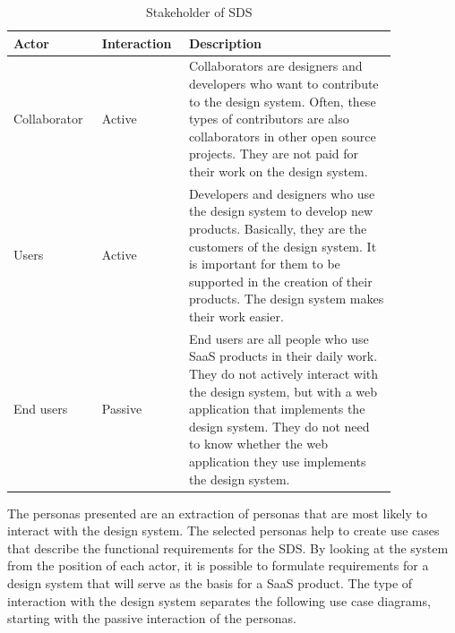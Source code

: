 \begin{table}[!ht]
    \begin{tabular}{|p{0.2\linewidth} | p{0.15\linewidth}| p{0.5\linewidth}|}
    \hline
     \textbf{Actor} &\textbf{Interaction} & \textbf{Description} \\ \hline
     Collaborator & Active & Collaborators are designers and developers who want to contribute to the design system. Often, these types of contributors are also collaborators in other open source projects. They are not paid for their work on the design system.  \\ \hline
     Users & Active & Developers and designers who use the design system to develop new products. Basically, they are the customers of the design system. It is important for them to be supported in the creation of their products. The design system makes their work easier.  \\ \hline
     End users & Passive & End users are all people who use SaaS products in their daily work. They do not actively interact with the design system, but with a web application that implements the design system. They do not need to know whether the web application they use implements the design system. \\ \hline
     
    \end{tabular}
    \caption{\label{tab:stakeholders_sds} Stakeholder of \ac{SDS}}
\end{table}
The personas presented are an extraction of personas that are most likely to interact with the design system. The selected personas help to create use cases that describe the functional requirements for the \ac{SDS}. By looking at the system from the position of each actor, it is possible to formulate requirements for a design system that will serve as the basis for a SaaS product. The type of interaction with the design system separates the following use case diagrams, starting with the passive interaction of the personas. \\

